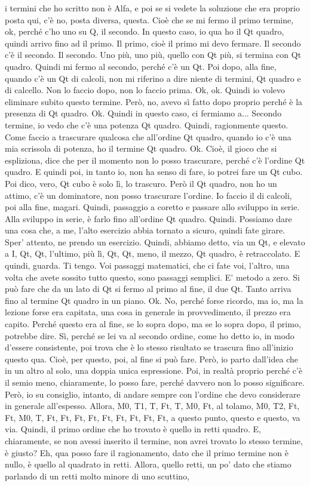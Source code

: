 \begin{soluzione}
{   i termini che ho scritto non è Alfa, e poi se si vedete la soluzione che era proprio posta qui, c'è no, posta diversa, questa. Cioè che se mi fermo il primo termine, ok, perché c'ho uno su Q, il secondo. In questo caso, io qua ho il Qt quadro, quindi arrivo fino ad il primo. Il primo, cioè il primo mi devo fermare. Il secondo c'è il secondo. Il secondo. Uno più, uno più, quello con Qt più, si termina con Qt quadro. Quindi mi fermo al secondo, perché c'è un Qt. Poi dopo, alla fine, quando c'è un Qt di calcoli, non mi riferino a dire niente di termini, Qt quadro e di calcello. Non lo faccio dopo, non lo faccio prima. Ok, ok. Quindi io volevo eliminare subito questo termine. Però, no, avevo sì fatto dopo proprio perché è la presenza di Qt quadro. Ok. Quindi in questo caso, ci fermiamo a... Secondo termine, io vedo che c'è una potenza Qt quadro. Quindi, ragionmente questo. Come faccio a trascurare qualcosa che all'ordine Qt quadro, quando io c'è una mia scrissola di potenza, ho il termine Qt quadro. Ok. Cioè, il gioco che si espliziona, dice che per il momento non lo posso trascurare, perché c'è l'ordine Qt quadro. E quindi poi, in tanto io, non ha senso di fare, io potrei fare un Qt cubo. Poi dico, vero, Qt cubo è solo lì, lo trascuro. Però il Qt quadro, non ho un attimo, c'è un dominatore, non posso trascurare l'ordine. Io faccio il di calcoli, poi alla fine, magari. Quindi, passaggio a coretto e passare allo sviluppo in serie. Alla sviluppo in serie, è farlo fino all'ordine Qt quadro. Quindi. Possiamo dare una cosa che, a me, l'alto esercizio abbia tornato a sicuro, quindi fate girare. Sper' attento, ne prendo un esercizio. Quindi, abbiamo detto, via un Qt, e elevato a I, Qt, Qt, l'ultimo, più lì, Qt, Qt, meno, il mezzo, Qt quadro, è retraccolato. E quindi, guarda. Ti tengo. Voi passaggi matematici, che ci fate voi, l'altro, una volta che avete sossito tutto questo, sono passaggi semplici. E' metodo a zero. Si può fare che da un lato di Qt si fermo al primo al fine, il due Qt. Tanto arriva fino al termine Qt quadro in un piano. Ok. No, perché forse ricordo, ma io, ma la lezione forse era capitata, una cosa in generale in provvedimento, il prezzo era capito. Perché questo era al fine, se lo sopra dopo, ma se lo sopra dopo, il primo, potrebbe dire. Sì, perché se lei va al secondo ordine, come ho detto io, in modo d'essere consistente, poi trova che è lo stesso risultato se trascura fino all'inizio questo qua. Cioè, per questo, poi, al fine si può fare. Però, io parto dall'idea che in un altro al solo, una doppia unica espressione. Poi, in realtà proprio perché c'è il semio meno, chiaramente, lo posso fare, perché davvero non lo posso significare. Però, io su consiglio, intanto, di andare sempre con l'ordine che devo considerare in generale all'espesso. Allora, M0, T1, T, Ft, T, M0, Ft, al tolamo, M0, T2, Ft, Ft, M0, T, Ft, Ft, Ft, Ft, Ft, Ft, Ft, Ft, Ft, a questo punto, questo e questo, va via. Quindi, il primo ordine che ho trovato è quello in retti quadro. E, chiaramente, se non avessi inserito il termine, non avrei trovato lo stesso termine, è giusto? Eh, qua posso fare il ragionamento, dato che il primo termine non è nullo, è quello al quadrato in retti. Allora, quello retti, un po' dato che stiamo parlando di un retti molto minore di uno scuttino, }
\end{soluzione}
